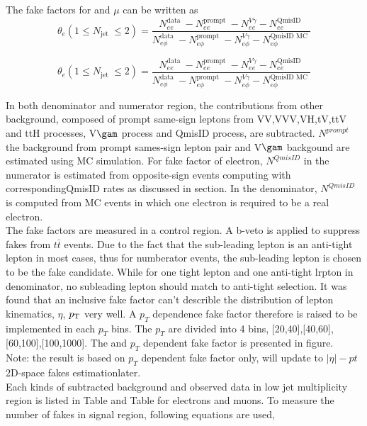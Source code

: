 The fake factors for \e and $\mu$ can be written as 
\begin{equation}
\theta_{e}\left(1 \leq N_{\text {jet }} \leq 2\right)=\frac{N_{e e}^{\text {data }}-N_{e e}^{\text {prompt }}-N_{e e}^{V \gamma}-N_{e e}^{\text {QmisID }}}{N_{e \phi}^{\text {data }}-N_{e \phi}^{\text {prompt }}-N_{e \phi}^{V \gamma}-N_{e \phi}^{\text {QmisID MC }}}
\end{equation}

\begin{equation}
\theta_{e}\left(1 \leq N_{\text {jet }} \leq 2\right)=\frac{N_{e e}^{\text {data }}-N_{e e}^{\text {prompt }}-N_{e e}^{V \gamma}-N_{e e}^{\text {QmisID }}}{N_{e \phi}^{\text {data }}-N_{e \phi}^{\text {prompt }}-N_{e \phi}^{V \gamma}-N_{e \phi}^{\text {QmisID MC }}}
\end{equation}

In both denominator and numerator region, the contributions from other background, composed of prompt same-sign leptons from VV,VVV,VH,tV,ttV and ttH processes, V$\gam$ process and QmisID process, are subtracted. $N^{prompt}$ the  background from prompt sames-sign lepton pair and V$\gam$ backgound are estimated using MC simulation. For fake factor of electron, $N^{QmisID}$ in the numerator is estimated from opposite-sign events computing with correspondingQmisID rates as discussed in section. In the denominator, $N^{QmisID}$ is computed from MC events in which one electron is required to be a real electron.\\

The fake factors are measured in a control region. A b-veto is applied to suppress fakes from $t\bar{t}$ events. Due to the fact that the sub-leading lepton is an anti-tight lepton in most cases, thus for numberator events, the sub-leading lepton is chosen to be the fake candidate. While for one tight lepton and one anti-tight lrpton in denominator, no subleading lepton should match to anti-tight selection. It was found that an inclusive fake factor can't describle the distribution of lepton kinematics, $\eta$, $p_{\mathrm{T}}$ very well. A $p_T$ dependence fake factor therefore is raised to be implemented in each $p_T$ bins. The $p_T$ are divided into 4 bins, [20,40],[40,60],[60,100],[100,1000]. The \eta and $p_T$ dependent fake factor is presented in figure.\\

Note: the result is based on $p_T$ dependent fake factor only, will update to $|\eta|-pt$ 2D-space fakes estimationlater.\\
Each kinds of subtracted background and observed data in low jet multiplicity region is listed in Table and Table for electrons and muons. To measure the number of fakes in signal region, following equations are used,

